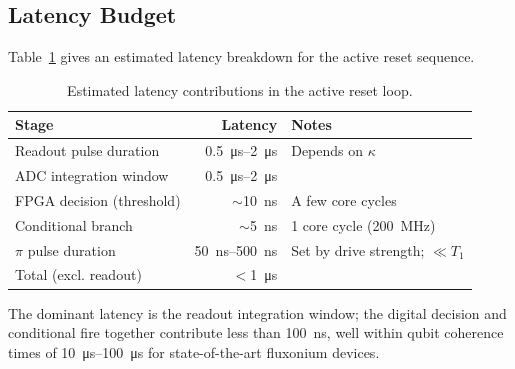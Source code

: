\subsection{Latency Budget}

Table~\ref{tab:latency} gives an estimated latency breakdown for the active reset
sequence.

\begin{table}[ht]
\centering
\caption{Estimated latency contributions in the active reset loop.}
\label{tab:latency}
\begin{tabular}{lrl}
\toprule
Stage & Latency & Notes \\
\midrule
Readout pulse duration     & \SIrange{0.5}{2}{\micro\second}   & Depends on $\kappa$ \\
ADC integration window     & \SIrange{0.5}{2}{\micro\second}   & \\
FPGA decision (threshold)  & $\sim$\SI{10}{\nano\second}        & A few core cycles \\
Conditional branch         & $\sim$\SI{5}{\nano\second}         & 1 core cycle (\SI{200}{MHz}) \\
$\pi$ pulse duration       & \SIrange{50}{500}{\nano\second}    & Set by drive strength; $\ll T_1$ \\
\midrule
Total (excl. readout)      & $<$\SI{1}{\micro\second}           & \\
\bottomrule
\end{tabular}
\end{table}

The dominant latency is the readout integration window; the digital decision and
conditional fire together contribute less than \SI{100}{\nano\second}, well within
qubit coherence times of \SIrange{10}{100}{\micro\second} for state-of-the-art
fluxonium devices.
